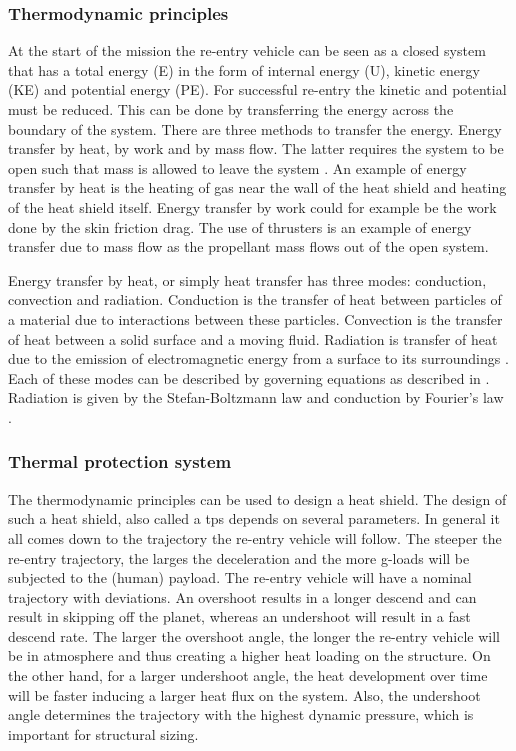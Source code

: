 \subsubsection{Thermodynamic principles}
At the start of the mission the re-entry vehicle can be seen as a closed system that has a total energy (E) in the form of internal energy (U), kinetic energy (KE) and potential energy (PE). For successful re-entry the kinetic and potential must be reduced. This can be done by transferring the energy across the boundary of the system. There are three methods to transfer the energy. Energy transfer by heat, by work and by mass flow. The latter requires the system to be open such that mass is allowed to leave the system \cite{Cengel2010}. An example of energy transfer by heat is the heating of gas near the wall of the heat shield and heating of the heat shield itself. Energy transfer by work could for example be the work done by the skin friction drag. The use of thrusters is an example of energy transfer due to mass flow as the propellant mass flows out of the open system. 

Energy transfer by heat, or simply heat transfer has three modes: conduction, convection and radiation. Conduction is the transfer of heat between particles of a material due to interactions between these particles. Convection is the transfer of heat between a solid surface and a moving fluid. Radiation is transfer of heat due to the emission of electromagnetic energy from a surface to its surroundings \cite{Cengel2010, Karam1998}. Each of these modes can be described by governing equations as described in \cite{Holman2002}. Radiation is given by the Stefan-Boltzmann law and conduction by Fourier's law \cite{Cengel2010, Holman2002}.


\subsubsection{Thermal protection system}
The thermodynamic principles can be used to design a heat shield. The design of such a heat shield, also called a \acrfull{tps} depends on several parameters. In general it all comes down to the trajectory the re-entry vehicle will follow. The steeper the re-entry trajectory, the larges the deceleration and the more g-loads will be subjected to the (human) payload. The re-entry vehicle will have a nominal trajectory with deviations. An overshoot results in a longer descend and can result in skipping off the planet, whereas an undershoot will result in a fast descend rate. The larger the overshoot angle, the longer the re-entry vehicle will be in atmosphere and thus creating a higher heat loading on the structure. On the other hand, for a larger undershoot angle, the heat development over time will be faster inducing a larger heat flux on the system. Also, the undershoot angle determines the trajectory with the highest dynamic pressure, which is important for structural sizing. 

